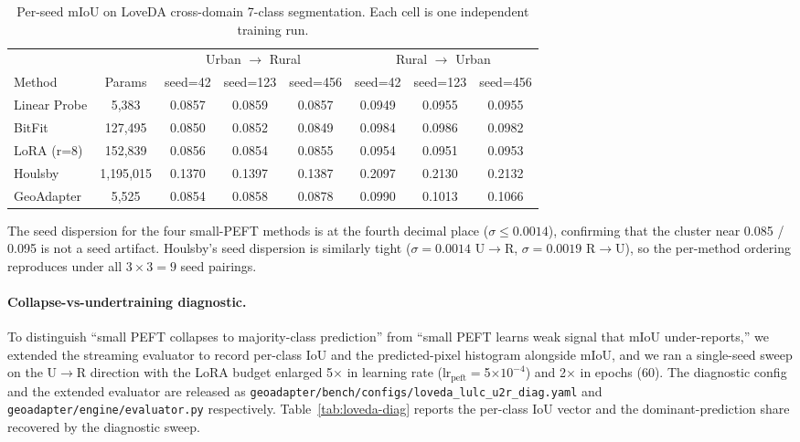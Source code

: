 \begin{table}[h]
\centering
\small
\caption{Per-seed mIoU on LoveDA cross-domain 7-class segmentation. Each cell is one independent training run.}
\label{tab:loveda-perseed}
\begin{tabular}{lccccccc}
\toprule
& & \multicolumn{3}{c}{Urban $\rightarrow$ Rural} & \multicolumn{3}{c}{Rural $\rightarrow$ Urban} \\
\cmidrule(lr){3-5}\cmidrule(lr){6-8}
Method & Params & seed=42 & seed=123 & seed=456 & seed=42 & seed=123 & seed=456 \\
\midrule
Linear Probe & 5{,}383       & 0.0857 & 0.0859 & 0.0857 & 0.0949 & 0.0955 & 0.0955 \\
BitFit       & 127{,}495     & 0.0850 & 0.0852 & 0.0849 & 0.0984 & 0.0986 & 0.0982 \\
LoRA (r=8)   & 152{,}839     & 0.0856 & 0.0854 & 0.0855 & 0.0954 & 0.0951 & 0.0953 \\
Houlsby      & 1{,}195{,}015 & 0.1370 & 0.1397 & 0.1387 & 0.2097 & 0.2130 & 0.2132 \\
GeoAdapter   & 5{,}525       & 0.0854 & 0.0858 & 0.0878 & 0.0990 & 0.1013 & 0.1066 \\
\bottomrule
\end{tabular}
\end{table}

The seed dispersion for the four small-PEFT methods is at the fourth decimal place ($\sigma \le 0.0014$), confirming that the cluster near 0.085 / 0.095 is not a seed artifact. Houlsby's seed dispersion is similarly tight ($\sigma = 0.0014$ U$\rightarrow$R, $\sigma = 0.0019$ R$\rightarrow$U), so the per-method ordering reproduces under all $3 \times 3 = 9$ seed pairings.

\paragraph{Collapse-vs-undertraining diagnostic.} To distinguish ``small PEFT collapses to majority-class prediction'' from ``small PEFT learns weak signal that mIoU under-reports,'' we extended the streaming evaluator to record per-class IoU and the predicted-pixel histogram alongside mIoU, and we ran a single-seed sweep on the U$\rightarrow$R direction with the LoRA budget enlarged 5$\times$ in learning rate (lr$_{\mathrm{peft}}$$=$5$\times 10^{-4}$) and 2$\times$ in epochs (60). The diagnostic config and the extended evaluator are released as \texttt{geoadapter/bench/configs/loveda\_lulc\_u2r\_diag.yaml} and \texttt{geoadapter/engine/evaluator.py} respectively. Table~\ref{tab:loveda-diag} reports the per-class IoU vector and the dominant-prediction share recovered by the diagnostic sweep.

